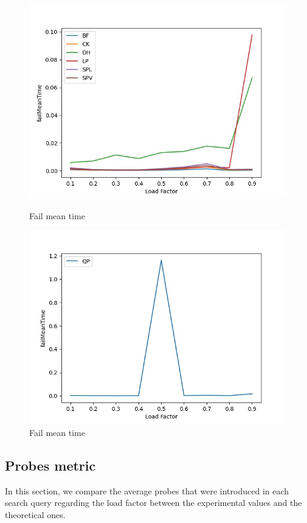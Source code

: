 \documentclass{article}
\begin{document}
        \begin{figure}[!h]
          \includegraphics[width=\linewidth]{images/loadFactor_vs_failMeanTime.jpeg}
          \caption{Fail mean time}\label{fig:plot2}
        \endminipage\hfill
          \includegraphics[width=\linewidth]{images/loadFactor_vs_failMeanTimeQP.jpeg}
          \caption{Fail mean time}\label{fig:plot3}
        \endminipage
        \end{figure}
    
    
    \subsection*{Probes metric}
    In this section, we compare the average probes that were introduced in each search query regarding the load factor between the experimental values and the theoretical ones.
    
\end{document}
